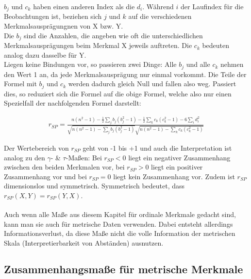 \documentclass[a4paper]{article}
\newcommand\dangersign[1][2ex]{%
  \renewcommand\stacktype{L}%
  \scaleto{\stackon[1.3pt]{\color{red}$\triangle$}{\tiny !}}{#1}%
}
\begin{document}
\noindent \dangersign[3ex] $b_j$ und $c_k$ haben einen anderen Index als die $d_i$. Während $i$ der Laufindex für die Beobachtungen ist, beziehen sich $j$ und $k$ auf die verschiedenen Merkmalsausprägungnen von X bzw. Y.\\

\noindent Die $b_j$ sind die Anzahlen, die angeben wie oft die unterschiedlichen Merkmalsausprägungen beim Merkmal X jeweils auftreten. Die $c_k$ bedeuten analog dazu dasselbe für Y.\\
Liegen keine Bindungen vor, so passieren zwei Dinge: Alle $b_j$ und alle $c_k$ nehmen den Wert 1 an, da jede Merkmalsausprägung nur einmal vorkommt. Die Teile der Formel mit $b_j$ und $c_k$ werden dadurch gleich Null und fallen also weg. Passiert dies, so reduziert sich die Formel auf die obige Formel, welche also nur einen Spezielfall der nachfolgenden Formel darstellt:

\begin{align*}
    r_{SP}=\frac{n(n^2-1)-\frac{1}{2}\sum_jb_j(b_j^2-1)-\frac{1}{2}\sum_kc_k(c_k^2-1)-6\sum_id_i^2}{\sqrt{n(n^2-1)-\sum_jb_j(b_j^2-1)}\sqrt{n(n^2-1)-\sum_kc_k(c_k^2-1)}}
\end{align*}

\noindent Der Wertebereich von $r_{SP}$ geht von -1 bis +1 und auch die Interpretation ist analog zu den $\gamma$- \& $\tau$-Maßen: Bei $r_{SP}<0$ liegt ein negativer Zusammenhang zwischen den beiden Merkmalen vor, bei $r_{SP}>0$ liegt ein positiver Zusammenhang vor und bei $r_{SP}=0$ liegt kein Zusammenhang vor. Zudem ist $r_{SP}$ dimensionslos und symmetrisch. Symmetrisch bedeutet, dass $r_{SP}(X,Y) = r_{SP}(Y,X)$.\\

\noindent {}\\

\noindent \dangersign[3ex] Auch wenn alle Maße aus diesem Kapitel für ordinale Merkmale gedacht sind, kann man sie auch für metrische Daten verwenden. Dabei entsteht allerdings Informationsverlust, da diese Maße nicht die volle Information der metrischen Skala (Interpretierbarkeit von Abständen) ausnutzen.

\clearpage

\subsection{Zusammenhangsmaße für metrische Merkmale}\label{sec:zshg-metr}
\end{document}
